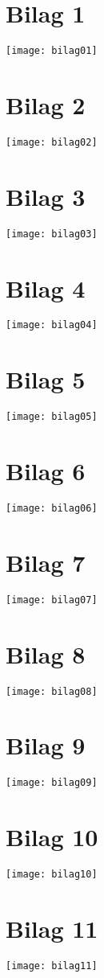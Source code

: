
\begin{appendices}
\section*{Bilag 1}\label{bilag1}
\noindent \texttt{[image: bilag01]}
\section*{Bilag 2}\label{bilag2}
\noindent \texttt{[image: bilag02]}
\section*{Bilag 3}\label{bilag3}
\noindent \texttt{[image: bilag03]}
\section*{Bilag 4}\label{bilag4}
\noindent \texttt{[image: bilag04]}
\section*{Bilag 5}\label{bilag5}
\noindent \texttt{[image: bilag05]}
\section*{Bilag 6}\label{bilag6}
\noindent \texttt{[image: bilag06]}
\section*{Bilag 7}\label{bilag7}
\noindent \texttt{[image: bilag07]}
\section*{Bilag 8}\label{bilag8}
\noindent \texttt{[image: bilag08]}
\section*{Bilag 9}\label{bilag9}
\noindent \texttt{[image: bilag09]}
\section*{Bilag 10}\label{bilag10}
\noindent \texttt{[image: bilag10]}
\section*{Bilag 11}\label{bilag11}
\noindent \texttt{[image: bilag11]}
\end{appendices}